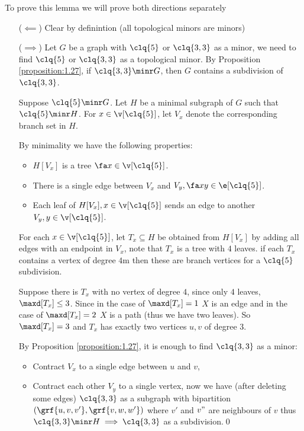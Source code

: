 \begin{prf}
    To prove this lemma we will prove both directions separately
    \begin{itemize}
        \item [($\impliedby$)] Clear by definintion (all topological minors are minors)
        \item [($\implies$)] Let $G$ be a graph with $\clq{5}$ or $\clq{3, 3}$ as a minor, we need to find $\clq{5}$ or $\clq{3, 3}$ as a topological minor. By Proposition \ref{proposition:1.27}, if $\clq{3, 3} \minr G$, then $G$ contains a subdivision of $\clq{3, 3}$.
        
        Suppose $\clq{5} \minr G$. Let $H$ be a minimal subgraph of $G$ such that $\clq{5} \minr H$. For $x \in \v[\clq{5}]$, let $V_x$ denote the corresponding branch set in $H$.

        By minimality we have the following properties:
        \begin{itemize}
            \item $H[V_x]$ is a tree $\fa x \in \v[\clq{5}]$.
            \item There is a single edge between $V_x$ and $V_y, \fa xy \in \e[\clq{5}]$.
            \item Each leaf of $H[V_x], x \in \v[\clq{5}]$ sends an edge to another $V_y, y \in \v[\clq{5}]$.
        \end{itemize}
        For each $x \in \v[\clq{5}]$, let $T_x \subseteq H$ be obtained from $H[V_x]$ by adding all edges with an endpoint in $V_x$, note that $T_x$ is a tree with $4$ leaves. if each $T_x$ contains a vertex of degree $4$m then these are branch vertices for a $\clq{5}$ subdivision.

        Suppose there is $T_x$ with no vertex of degree $4$, since only $4$ leaves, $\maxd[T_x] \leq 3$. Since in the case of $\maxd[T_x] = 1$ $X$ is an edge and in the case of $\maxd[T_x] = 2$ $X$ is a path (thus we have two leaves). So $\maxd[T_x] = 3$  and $T_x$ has exactly two vertices $u, v$ of degree $3$.

        By Proposition \ref{proposition:1.27}, it is enough to find $\clq{3, 3}$ as a minor:
        \begin{itemize}
            \item Contract $V_x$ to a single edge between $u$ and $v$,
            \item Contract each other $V_y$ to a single vertex, now we have (after deleting some edges) $\clq{3, 3}$ as a subgraph with bipartition $(\grf{u, v, v'}, \grf{v, w, w'})$ where $v'$ and $v"$ are neighbours of $v$ thus $\clq{3, 3} \minr H \implies \clq{3, 3}$ as a subdivision.\qed
        \end{itemize}
    \end{itemize}
\end{prf}
